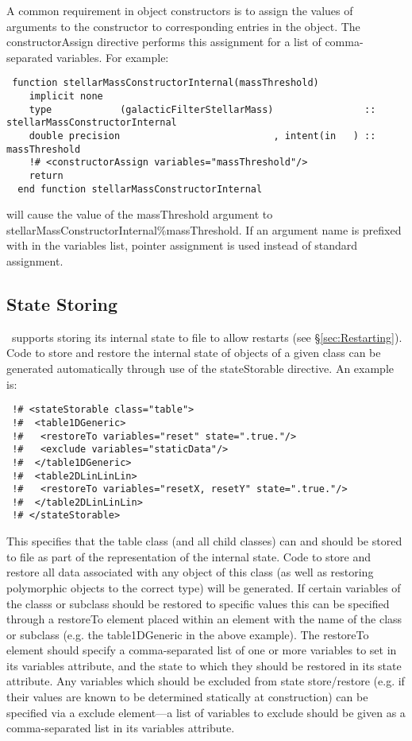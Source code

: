 A common requirement in object constructors is to assign the values of arguments to the constructor to corresponding entries in the object. The {\normalfont \ttfamily constructorAssign} directive performs this assignment for a list of comma-separated variables. For example:
\begin{lstlisting}  
 function stellarMassConstructorInternal(massThreshold)
    implicit none
    type            (galacticFilterStellarMass)                :: stellarMassConstructorInternal
    double precision                           , intent(in   ) :: massThreshold
    !# <constructorAssign variables="massThreshold"/>
    return
  end function stellarMassConstructorInternal
\end{lstlisting}
will cause the value of the {\normalfont \ttfamily massThreshold} argument to {\normalfont \ttfamily stellarMassConstructorInternal\%massThreshold}. If an argument name is prefixed with {\normalfont \ttfamily \textasteriskcentered} in the variables list, pointer assignment is used instead of standard assignment.

\subsection{State Storing}

\glc\ supports storing its internal state to file to allow restarts (see \S\ref{sec:Restarting}). Code to store and restore the internal state of objects of a given class can be generated automatically through use of the {\normalfont \ttfamily stateStorable} directive. An example is:
\begin{verbatim}
 !# <stateStorable class="table">
 !#  <table1DGeneric>
 !#   <restoreTo variables="reset" state=".true."/>
 !#   <exclude variables="staticData"/>
 !#  </table1DGeneric>
 !#  <table2DLinLinLin>
 !#   <restoreTo variables="resetX, resetY" state=".true."/>
 !#  </table2DLinLinLin>  
 !# </stateStorable>
\end{verbatim}
This specifies that the {\normalfont \ttfamily table} class (and all child classes) can and should be stored to file as part of the representation of the internal state. Code to store and restore all data associated with any object of this class (as well as restoring polymorphic objects to the correct type) will be generated. If certain variables of the classs or subclass should be restored to specific values this can be specified through a {\normalfont \ttfamily restoreTo} element placed within an element with the name of the class or subclass (e.g. the {\normalfont \ttfamily table1DGeneric} in the above example). The {\normalfont \ttfamily restoreTo} element should specify a comma-separated list of one or more variables to set in its {\normalfont \ttfamily variables} attribute, and the state to which they should be restored in its {\normalfont \ttfamily state} attribute. Any variables which should be excluded from state store/restore (e.g. if their values are known to be determined statically at construction) can be specified via a {\normalfont \ttfamily exclude} element---a list of variables to exclude should be given as a comma-separated list in its {\normalfont \ttfamily variables} attribute.

